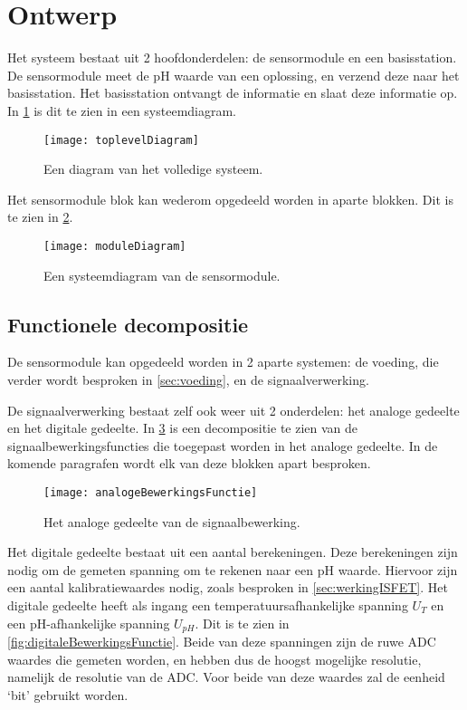 \section{Ontwerp}\label{sec:ontwerp}
Het systeem bestaat uit 2 hoofdonderdelen: de sensormodule en een basisstation. De sensormodule meet de pH waarde van een oplossing, en verzend deze naar het basisstation. Het basisstation ontvangt de informatie en slaat deze informatie op.
In \cref{fig:functional} is dit te zien in een systeemdiagram.

\begin{figure}[!htbp]
    \centering
    \texttt{[image: toplevelDiagram]}
    \caption[short]{Een diagram van het volledige systeem.}
    \label{fig:functional}
\end{figure}

Het sensormodule blok kan wederom opgedeeld worden in aparte blokken. Dit is te zien in \cref{fig:moduleDiagram}.

\begin{figure}[!htbp]
    \centering
    \texttt{[image: moduleDiagram]}
    \caption{Een systeemdiagram van de sensormodule.}
    \label{fig:moduleDiagram}
\end{figure}

\subsection{Functionele decompositie} \label{sec:functioneleDecompositie}
De sensormodule kan opgedeeld worden in 2 aparte systemen: de voeding, die verder wordt besproken in \cref{sec:voeding}, en de signaalverwerking.

De signaalverwerking bestaat zelf ook weer uit 2 onderdelen: het analoge gedeelte en het digitale gedeelte. In \cref{fig:analogeBewerkingsFunctie} is een decompositie te zien van de signaalbewerkingsfuncties die toegepast worden in het analoge gedeelte. In de komende paragrafen wordt elk van deze blokken apart besproken.

\begin{figure}[!htbp]
    \centering
    \texttt{[image: analogeBewerkingsFunctie]}
    \caption{Het analoge gedeelte van de signaalbewerking.}
    \label{fig:analogeBewerkingsFunctie}
\end{figure}


Het digitale gedeelte bestaat uit een aantal berekeningen. Deze berekeningen zijn nodig om de gemeten spanning om te rekenen naar een pH waarde. Hiervoor zijn een aantal kalibratiewaardes nodig, zoals besproken in \cref{sec:werkingISFET}. Het digitale gedeelte heeft als ingang een temperatuursafhankelijke spanning $U_T$ en een pH-afhankelijke spanning $U_{pH}$. Dit is te zien in \cref{fig:digitaleBewerkingsFunctie}. Beide van deze spanningen zijn de ruwe ADC waardes die gemeten worden, en hebben dus de hoogst mogelijke resolutie, namelijk de resolutie van de ADC. Voor beide van deze waardes zal de eenheid `bit' gebruikt worden.

